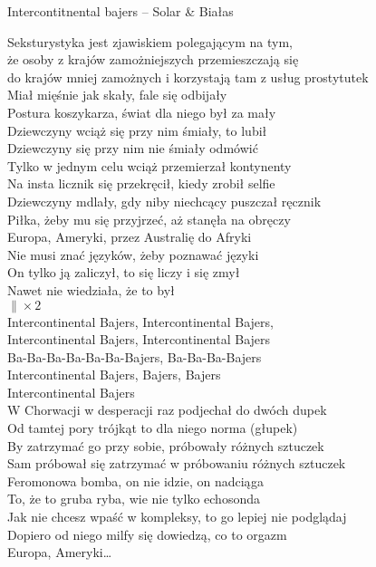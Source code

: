 \begin{piosenka}{Intercontitnental bajers -- Solar \& Białas}

Seksturystyka jest zjawiskiem polegającym na tym, \\ 
że osoby z krajów zamożniejszych przemieszczają się \\
do krajów mniej zamożnych i korzystają tam z usług prostytutek \\[\zwrotkaspace]

Miał mięśnie jak skały, fale się odbijały \\
Postura koszykarza, świat dla niego był za mały \\
Dziewczyny wciąż się przy nim śmiały, to lubił \\
Dziewczyny się przy nim nie śmiały odmówić \\[\zwrotkaspace]

Tylko w jednym celu wciąż przemierzał kontynenty \\
Na insta licznik się przekręcił, kiedy zrobił selfie \\
Dziewczyny mdlały, gdy niby niechcący puszczał ręcznik \\
Piłka, żeby mu się przyjrzeć, aż stanęła na obręczy \\[\zwrotkaspace]

 Europa, Ameryki, przez Australię do Afryki \\
 Nie musi znać języków, żeby poznawać języki \\
 On tylko ją zaliczył, to się liczy i się zmył \\
 Nawet nie wiedziała, że to był \\
 $\| \times 2$ \\[\zwrotkaspace]

 Intercontinental Bajers, Intercontinental Bajers, \\
 Intercontinental Bajers, Intercontinental Bajers \\
 Ba-Ba-Ba-Ba-Ba-Ba-Bajers, Ba-Ba-Ba-Bajers \\[\zwrotkaspace]

Intercontinental Bajers, Bajers, Bajers \\
Intercontinental Bajers \\[\zwrotkaspace]

W Chorwacji w desperacji raz podjechał do dwóch dupek \\
Od tamtej pory trójkąt to dla niego norma (głupek) \\
By zatrzymać go przy sobie, próbowały różnych sztuczek \\
Sam próbował się zatrzymać w próbowaniu różnych sztuczek \\[\zwrotkaspace]

Feromonowa bomba, on nie idzie, on nadciąga \\
To, że to gruba ryba, wie nie tylko echosonda \\
Jak nie chcesz wpaść w kompleksy, to go lepiej nie podglądaj \\
Dopiero od niego milfy się dowiedzą, co to orgazm \\[\zwrotkaspace]

 Europa, Ameryki\ldots \\[\zwrotkaspace]


\end{piosenka}